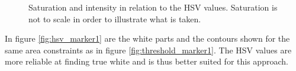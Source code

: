 \begin{figure}[H]
\centering
 \caption[Saturation and intensity in relation to the HSV values.]{Saturation and intensity in relation to the HSV values. Saturation is not to scale in order to illustrate what is taken.}
 \label{fig:hsv_intensity}
\end{figure}


In figure \ref{fig:hsv_marker1} are the white parts and the contours shown for the same area constraints as in figure \ref{fig:threshold_marker1}.
The HSV values are more reliable at finding true white and is thus better suited for this approach.

